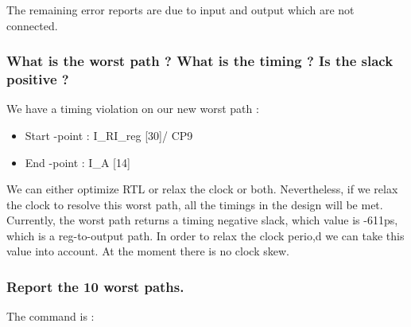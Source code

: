 \documentclass[11pt,a4paper,sans,dvipsnames]{report}
\begin{document}
	The remaining error reports are due to input and output which are not connected.

	\begin{figure}[h!]
		\centering
		
		\label{fig:timing_not_met}
	\end{figure}

	\subsubsection*{What is the worst path ? What is the timing ? Is the slack positive ?}

	We have a timing violation on our new worst path :
	\begin{itemize}
		\item Start -point   : I\_RI\_reg [30]/ CP9
		\item End -point     : I\_A [14]
	\end{itemize}

	We can either optimize RTL or relax the clock or both. Nevertheless, if we relax the clock to resolve this worst path, all the timings in the design will be met.
	Currently, the worst path returns a timing negative slack, which value is -611ps, which is a reg-to-output path. In order to relax the clock perio,d we can take this value into account. At the moment there is no clock skew.

	\subsubsection*{Report the 10 worst paths.}

	The command is : 
\end{document}

